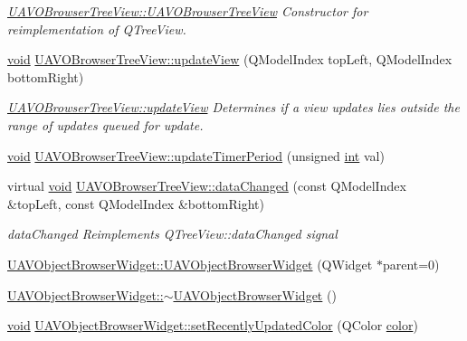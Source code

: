 \begin{DoxyCompactItemize}
\begin{DoxyCompactList}\small\item\em \hyperlink{group___u_a_v_object_browser_plugin_gac8e16cfc29870fb1f96574c5e0a99f13}{U\-A\-V\-O\-Browser\-Tree\-View\-::\-U\-A\-V\-O\-Browser\-Tree\-View} Constructor for reimplementation of Q\-Tree\-View. \end{DoxyCompactList}\item 
\hyperlink{group___u_a_v_objects_plugin_ga444cf2ff3f0ecbe028adce838d373f5c}{void} \hyperlink{group___u_a_v_object_browser_plugin_ga39a127a4af34e1ea92aca8448ee5e92f}{U\-A\-V\-O\-Browser\-Tree\-View\-::update\-View} (Q\-Model\-Index top\-Left, Q\-Model\-Index bottom\-Right)
\begin{DoxyCompactList}\small\item\em \hyperlink{group___u_a_v_object_browser_plugin_ga39a127a4af34e1ea92aca8448ee5e92f}{U\-A\-V\-O\-Browser\-Tree\-View\-::update\-View} Determines if a view updates lies outside the range of updates queued for update. \end{DoxyCompactList}\item 
\hyperlink{group___u_a_v_objects_plugin_ga444cf2ff3f0ecbe028adce838d373f5c}{void} \hyperlink{group___u_a_v_object_browser_plugin_ga9a903a75f0eb4f7b88c87dc948d8f63a}{U\-A\-V\-O\-Browser\-Tree\-View\-::update\-Timer\-Period} (unsigned \hyperlink{ioapi_8h_a787fa3cf048117ba7123753c1e74fcd6}{int} val)
\item 
virtual \hyperlink{group___u_a_v_objects_plugin_ga444cf2ff3f0ecbe028adce838d373f5c}{void} \hyperlink{group___u_a_v_object_browser_plugin_ga854dce00ee3378eb2fc1414eaaaf2a00}{U\-A\-V\-O\-Browser\-Tree\-View\-::data\-Changed} (const Q\-Model\-Index \&top\-Left, const Q\-Model\-Index \&bottom\-Right)
\begin{DoxyCompactList}\small\item\em data\-Changed Reimplements Q\-Tree\-View\-::data\-Changed signal \end{DoxyCompactList}\item 
\hyperlink{group___u_a_v_object_browser_plugin_ga403353bfa1860704e97addda60292b5d}{U\-A\-V\-Object\-Browser\-Widget\-::\-U\-A\-V\-Object\-Browser\-Widget} (Q\-Widget $\ast$parent=0)
\item 
\hyperlink{group___u_a_v_object_browser_plugin_gacff305183afd2168e382970b086cf108}{U\-A\-V\-Object\-Browser\-Widget\-::$\sim$\-U\-A\-V\-Object\-Browser\-Widget} ()
\item 
\hyperlink{group___u_a_v_objects_plugin_ga444cf2ff3f0ecbe028adce838d373f5c}{void} \hyperlink{group___u_a_v_object_browser_plugin_gae78918a99387bda266b432b5ded9168e}{U\-A\-V\-Object\-Browser\-Widget\-::set\-Recently\-Updated\-Color} (Q\-Color \hyperlink{glext_8h_a3ea846f998d64f079b86052b6c4193a8}{color})

\end{DoxyCompactItemize}
